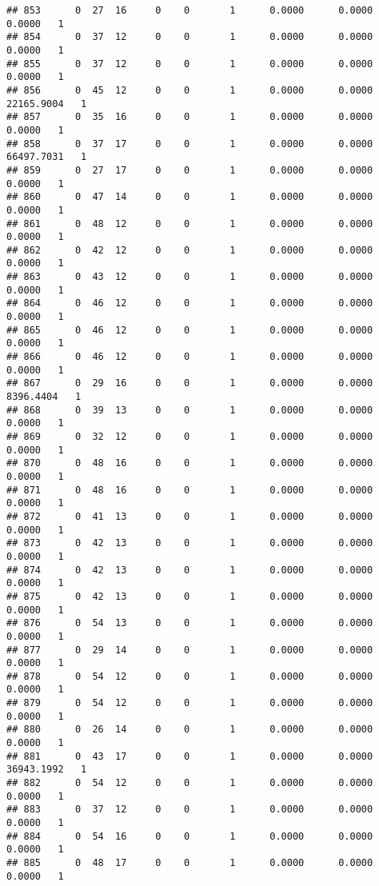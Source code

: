 \documentclass[
]{article}
\begin{document}
\begin{enumerate}
\begin{verbatim}
## 853      0  27  16     0    0       1      0.0000      0.0000      0.0000   1
## 854      0  37  12     0    0       1      0.0000      0.0000      0.0000   1
## 855      0  37  12     0    0       1      0.0000      0.0000      0.0000   1
## 856      0  45  12     0    0       1      0.0000      0.0000  22165.9004   1
## 857      0  35  16     0    0       1      0.0000      0.0000      0.0000   1
## 858      0  37  17     0    0       1      0.0000      0.0000  66497.7031   1
## 859      0  27  17     0    0       1      0.0000      0.0000      0.0000   1
## 860      0  47  14     0    0       1      0.0000      0.0000      0.0000   1
## 861      0  48  12     0    0       1      0.0000      0.0000      0.0000   1
## 862      0  42  12     0    0       1      0.0000      0.0000      0.0000   1
## 863      0  43  12     0    0       1      0.0000      0.0000      0.0000   1
## 864      0  46  12     0    0       1      0.0000      0.0000      0.0000   1
## 865      0  46  12     0    0       1      0.0000      0.0000      0.0000   1
## 866      0  46  12     0    0       1      0.0000      0.0000      0.0000   1
## 867      0  29  16     0    0       1      0.0000      0.0000   8396.4404   1
## 868      0  39  13     0    0       1      0.0000      0.0000      0.0000   1
## 869      0  32  12     0    0       1      0.0000      0.0000      0.0000   1
## 870      0  48  16     0    0       1      0.0000      0.0000      0.0000   1
## 871      0  48  16     0    0       1      0.0000      0.0000      0.0000   1
## 872      0  41  13     0    0       1      0.0000      0.0000      0.0000   1
## 873      0  42  13     0    0       1      0.0000      0.0000      0.0000   1
## 874      0  42  13     0    0       1      0.0000      0.0000      0.0000   1
## 875      0  42  13     0    0       1      0.0000      0.0000      0.0000   1
## 876      0  54  13     0    0       1      0.0000      0.0000      0.0000   1
## 877      0  29  14     0    0       1      0.0000      0.0000      0.0000   1
## 878      0  54  12     0    0       1      0.0000      0.0000      0.0000   1
## 879      0  54  12     0    0       1      0.0000      0.0000      0.0000   1
## 880      0  26  14     0    0       1      0.0000      0.0000      0.0000   1
## 881      0  43  17     0    0       1      0.0000      0.0000  36943.1992   1
## 882      0  54  12     0    0       1      0.0000      0.0000      0.0000   1
## 883      0  37  12     0    0       1      0.0000      0.0000      0.0000   1
## 884      0  54  16     0    0       1      0.0000      0.0000      0.0000   1
## 885      0  48  17     0    0       1      0.0000      0.0000      0.0000   1

\end{verbatim}
\end{enumerate}
\end{document}
